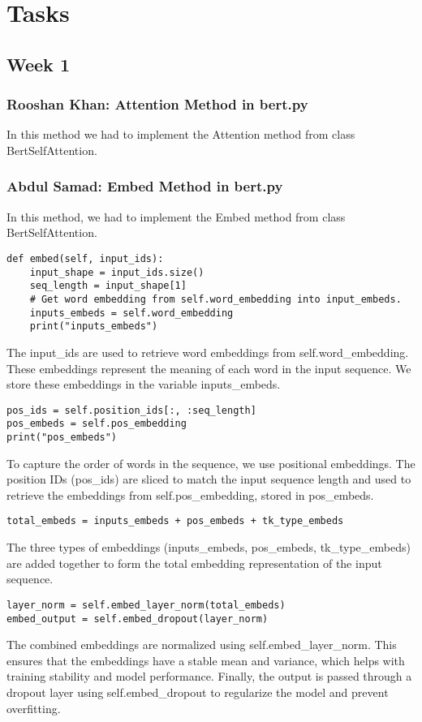 \documentclass{article}
\begin{document}
\section{Tasks}
\subsection{Week 1}
\subsubsection{Rooshan Khan: Attention Method in bert.py}
In this method we had to implement the Attention method from class BertSelfAttention.
\subsubsection{Abdul Samad: Embed Method in bert.py}
In this method, we had to implement the Embed method from class BertSelfAttention.
\begin{lstlisting}
def embed(self, input_ids):
    input_shape = input_ids.size()
    seq_length = input_shape[1]
    # Get word embedding from self.word_embedding into input_embeds.
    inputs_embeds = self.word_embedding
    print("inputs_embeds")
\end{lstlisting}
The input\_ids are used to retrieve word embeddings from self.word\_embedding. These embeddings represent the meaning of each word in the input sequence. We store these embeddings in the variable inputs\_embeds.
\begin{lstlisting}
pos_ids = self.position_ids[:, :seq_length]
pos_embeds = self.pos_embedding
print("pos_embeds")
\end{lstlisting}
To capture the order of words in the sequence, we use positional embeddings. The position IDs (pos\_ids) are sliced to match the input sequence length and used to retrieve the embeddings from self.pos\_embedding, stored in pos\_embeds.

\begin{lstlisting}
total_embeds = inputs_embeds + pos_embeds + tk_type_embeds
\end{lstlisting}
The three types of embeddings (inputs\_embeds, pos\_embeds, tk\_type\_embeds) are added together to form the total embedding representation of the input sequence.
\begin{lstlisting}
layer_norm = self.embed_layer_norm(total_embeds)
embed_output = self.embed_dropout(layer_norm)
\end{lstlisting}
The combined embeddings are normalized using self.embed\_layer\_norm. This ensures that the embeddings have a stable mean and variance, which helps with training stability and model performance. Finally, the output is passed through a dropout layer using self.embed\_dropout to regularize the model and prevent overfitting.
\end{document}
